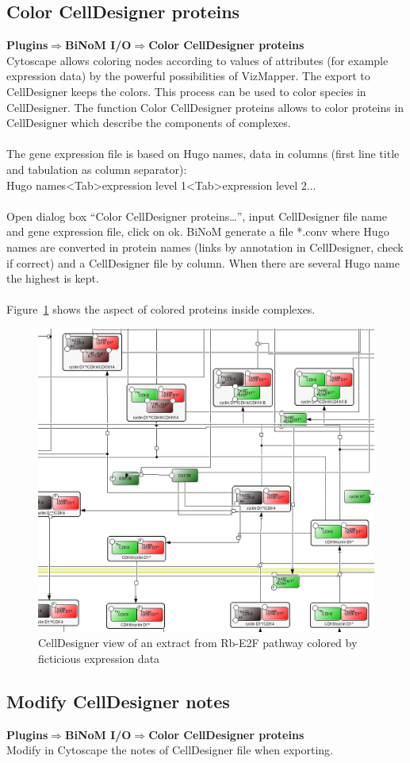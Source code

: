 \subsection{Color CellDesigner proteins}
\textbf{Plugins$\Rightarrow$BiNoM I/O$\Rightarrow$Color CellDesigner proteins}\\
Cytoscape allows coloring nodes according to values of attributes (for example expression data) by the powerful possibilities of VizMapper. The export to CellDesigner keeps the colors. This process can be used to color species in CellDesigner. The function Color CellDesigner proteins allows to color proteins in CellDesigner which describe the components of complexes.\\\\
The gene expression file is based on Hugo names, data in columns (first line title and tabulation as column separator):\\Hugo names\textless Tab\textgreater expression level 1\textless Tab\textgreater expression level 2$\ldots$\\\\
Open dialog box “Color CellDesigner proteins…”, input CellDesigner file name and gene expression file, click on ok. BiNoM generate a file *.conv where Hugo names are converted in protein names (links by annotation in CellDesigner, check if correct) and a CellDesigner file by column. When there are several Hugo name the highest is kept.\\\\
Figure~\ref{Colored_CellDesigner_view_by_ficticious_data} shows the aspect of colored proteins inside complexes.
\begin{figure}
\centering
\includegraphics[width=18 cm]{graphics/Colored_CellDesigner_view_by_ficticious_data}
\caption{CellDesigner view of an extract from Rb-E2F\cite{calzone2008comprehensive} pathway colored by ficticious expression data}
\label{Colored_CellDesigner_view_by_ficticious_data}
\end{figure}

\subsection{Modify CellDesigner notes}
\textbf{Plugins$\Rightarrow$BiNoM I/O$\Rightarrow$Color CellDesigner proteins}\\
Modify in Cytoscape the notes of CellDesigner file when exporting.
